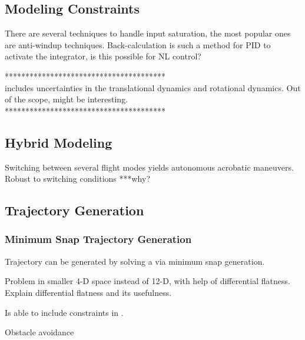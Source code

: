 

\subsection{Modeling Constraints}
There are several techniques to handle input saturation, the most popular ones are anti-windup techniques. Back-calculation is such a method for PID to activate the integrator, is this possible for NL control?

***************************************\\
\cite{Goodarzi2013a} includes uncertainties in the translational dynamics and rotational dynamics. Out of the scope, might be interesting.\\
***************************************\\

\subsection{Hybrid Modeling}
Switching between several flight modes yields autonomous acrobatic maneuvers. Robust to switching conditions ***why?\\
\cite{Tang2014}

\subsection{Trajectory Generation}
\subsubsection{Minimum Snap Trajectory Generation}

Trajectory can be generated by solving a  via minimum snap generation.

Problem in smaller 4-D space instead of 12-D, with help of differential flatness. Explain differential flatness and its usefulness.

Is able to include constraints in .

\cite{Mellinger2011}

Obstacle avoidance


